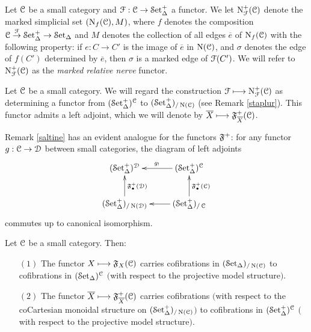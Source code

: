 \begin{definition}
Let $\calC$ be a small category and $\calF: \calC \rightarrow \mSet$ a functor. We let
$\Nerve^{+}_{\calF}(\calC)$ denote the marked simplicial set
$( \Nerve_{f}(\calC), M)$, where $f$ denotes the composition
$\calC \stackrel{\calF}{\rightarrow} \mSet \rightarrow \sSet$ and
$M$ denotes the collection of all edges $\overline{e}$ of $\Nerve_{f}(\calC)$ with the following property:
if $e: C \rightarrow C'$ is the image of $\overline{e}$ in $\Nerve(\calC)$, and $\sigma$ denotes the
edge of $f(C')$ determined by $\overline{e}$, then $\sigma$ is a marked edge of $\calF(C')$.
We will refer to $\Nerve^{+}_{\calF}(\calC)$ as the {\it marked relative nerve} functor.
\end{definition}

\begin{remark}
Let $\calC$ be a small category. We will regard the construction $\calF \mapsto \Nerve^{+}_{\calF}(\calC)$ as determining a functor from $(\mSet)^{\calC}$ to $\mset{\Nerve(\calC) }$ (see Remark \ref{staplur}). This functor admits a left adjoint, which we will denote by $\overline{X} \mapsto \lNerve^{+}_{\overline{X}}(\calC)$.
\end{remark}

\begin{remark}\label{saltine2}
Remark \ref{saltine} has an evident analogue for the functors $\lNerve^{+}$: 
for any functor $g: \calC \rightarrow \calD$ between small categories, the diagram of left adjoints
$$ \xymatrix{ (\mSet)^{\calD} & (\mSet)^{\calC} \ar[l]_{g_{!} } \\
\mset{\Nerve(\calD)} \ar[u]_{ \lNerve^{+}_{\bigdot}(\calD)} & \mset{\calC} \ar[u]_{\lNerve^{+}_{\bigdot}(\calC)} \ar[l] }$$
commutes up to canonical isomorphism.
\end{remark}

\begin{lemma}\label{coughup}
Let $\calC$ be a small category. Then:
\begin{itemize}
\item[$(1)$] The functor $X \mapsto \lNerve_{X}(\calC)$ carries
cofibrations in $(\sSet)_{/ \Nerve(\calC)}$
to cofibrations in $(\sSet)^{\calC}$ $($with respect to the projective model structure$)$.
\item[$(2)$] The functor $\overline{X} \mapsto \lNerve^{+}_{\overline{X}}(\calC)$ carries
cofibrations $($with respect to the coCartesian monoidal structure on  $\mset{\Nerve(\calC)}${}$)$ to cofibrations in $(\mSet)^{\calC}$ $($with respect to the projective model structure$)$.
\end{itemize}
\end{lemma}

